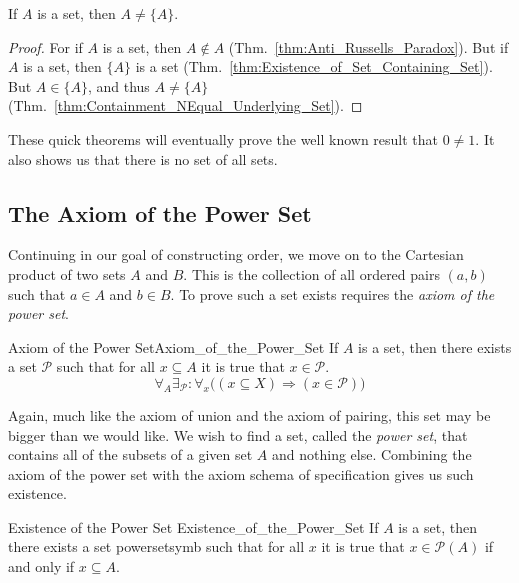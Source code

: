         \begin{theorem}
            \label{thm:Cor_of_Containment_NEqual_Underlying_Set}%
            If $A$ is a set, then $A\ne\{A\}$.
        \end{theorem}
        \begin{proof}
            For if $A$ is a set, then $A\notin{A}$
            (Thm.~\ref{thm:Anti_Russells_Paradox}). But if $A$ is a set, then
            $\{A\}$ is a set (Thm.~\ref{thm:Existence_of_Set_Containing_Set}).
            But $A\in\{A\}$, and thus $A\ne\{A\}$
            (Thm.~\ref{thm:Containment_NEqual_Underlying_Set}).
        \end{proof}
        These quick theorems will eventually prove the well known result that
        $0\ne{1}$. It also shows us that there is no set of all
        sets.
    \subsection{The Axiom of the Power Set}
        Continuing in our goal of constructing order, we move on to the
        Cartesian product of two sets $A$ and $B$. This
        is the collection of all ordered pairs $(a,b)$ such that $a\in{A}$ and
        $b\in{B}$. To prove such a set exists requires the
        \textit{axiom of the power set}.
        \begin{faxiom}{Axiom of the Power Set}{Axiom_of_the_Power_Set}
            If $A$ is a set, then there exists a set $\mathscr{P}$ such that
            for all $x\subseteq{A}$ it is true that $x\in\mathscr{P}$.
            \begin{equation*}
                \forall_{A}\exists_{\mathscr{P}}:
                \forall_{x}\Big((x\subseteq{X})\Rightarrow(x\in\mathscr{P})\Big)
            \end{equation*}
        \end{faxiom}
        Again, much like the axiom of union and the axiom of pairing, this
        set may be bigger than we would like. We wish to find a set, called
        the \textit{power set}, that contains all of the subsets of a given
        set $A$ and nothing else. Combining the axiom of the power set
        with the axiom schema of specification gives us such existence.
        \begin{ltheorem}{Existence of the Power Set}
                        {Existence_of_the_Power_Set}
            If $A$ is a set, then there exists a set \gls{powersetsymb}
            such that for all $x$ it is true that $x\in\mathcal{P}(A)$ if and
            only if $x\subseteq{A}$.
        \end{ltheorem}
